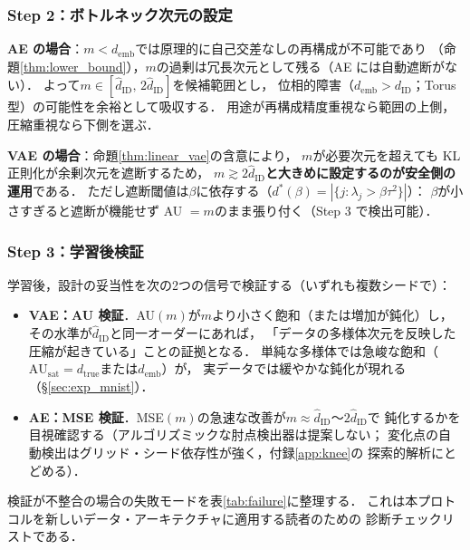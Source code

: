 \documentclass[11pt,a4paper]{jsarticle}
\newcommand{\dID}{d_{\mathrm{ID}}}
\newcommand{\hatdID}{\hat{d}_{\mathrm{ID}}}
\newcommand{\dtrue}{d_{\mathrm{true}}}
\newcommand{\AUsat}{\mathrm{AU}_{\mathrm{sat}}}
\newcommand{\demb}{d_{\mathrm{emb}}}
\newcommand{\dstar}{d^{*}(\beta)}
\begin{document}
\subsubsection{Step 2：ボトルネック次元の設定}\label{sec:protocol_s2}

\textbf{AE の場合}：$m < \demb$では原理的に自己交差なしの再構成が不可能であり
（命題\ref{thm:lower_bound}），$m$の過剰は冗長次元として残る（AE には自動遮断がない）．
よって$m \in [\hatdID,\, 2\hatdID]$を候補範囲とし，
位相的障害（$\demb > \dID$；Torus 型）の可能性を余裕として吸収する．
用途が再構成精度重視なら範囲の上側，圧縮重視なら下側を選ぶ．

\textbf{VAE の場合}：命題\ref{thm:linear_vae}の含意により，
$m$が必要次元を超えても KL 正則化が余剰次元を遮断するため，
\textbf{$m \gtrsim 2\hatdID$と大きめに設定するのが安全側の運用}である．
ただし遮断閾値は$\beta$に依存する（$\dstar = |\{j : \lambda_j > \beta\tau^2\}|$）：
$\beta$が小さすぎると遮断が機能せず AU $= m$のまま張り付く（Step 3 で検出可能）．

\subsubsection{Step 3：学習後検証}\label{sec:protocol_s3}

学習後，設計の妥当性を次の2つの信号で検証する（いずれも複数シードで）：
\begin{itemize}
  \item \textbf{VAE：AU 検証}．AU$(m)$が$m$より小さく飽和（または増加が鈍化）し，
        その水準が$\hatdID$と同一オーダーにあれば，
        「データの多様体次元を反映した圧縮が起きている」ことの証拠となる．
        単純な多様体では急峻な飽和（$\AUsat = \dtrue$または$\demb$）が，
        実データでは緩やかな鈍化が現れる（§\ref{sec:exp_mnist}）．
  \item \textbf{AE：MSE 検証}．MSE$(m)$の急速な改善が$m \approx \hatdID$〜$2\hatdID$で
        鈍化するかを目視確認する（アルゴリズミックな肘点検出器は提案しない；
        変化点の自動検出はグリッド・シード依存性が強く，付録\ref{app:knee}の
        探索的解析にとどめる）．
\end{itemize}

検証が不整合の場合の失敗モードを表\ref{tab:failure}に整理する．
これは本プロトコルを新しいデータ・アーキテクチャに適用する読者のための
診断チェックリストである．
\end{document}
